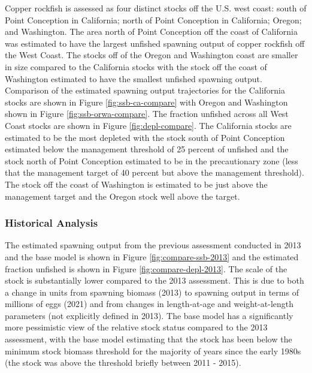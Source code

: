 \documentclass[11pt,
  english,
  a4paper,
]{article}
\begin{document}
\leavevmode\tagmcend\tagstructend


Copper rockfish is assessed as four distinct stocks off the U.S. west coast: south of Point Conception in California; north of Point Conception in California; Oregon; and Washington. The area north of Point Conception off the coast of California was estimated to have the largest unfished spawning output of copper rockfish off the West Coast. The stocks off of the Oregon and Washington coast are smaller in size compared to the California stocks with the stock off the coast of Washington estimated to have the smallest unfished spawning output. Comparison of the estimated spawning output trajectories for the California stocks are shown in Figure \ref{fig:ssb-ca-compare} with Oregon and Washington shown in Figure \ref{fig:ssb-orwa-compare}. The fraction unfished across all West Coast stocks are shown in Figure \ref{fig:depl-compare}. The California stocks are estimated to be the most depleted with the stock south of Point Conception estimated below the management threshold of 25 percent of unfished and the stock north of Point Conception estimated to be in the precautionary zone (less that the management target of 40 percent but above the management threshold). The stock off the coast of Washington is estimated to be just above the management target and the Oregon stock well above the target.

\leavevmode\tagmcend\tagstructend\par


\hypertarget{historical-analysis}{%
\subsubsection{Historical Analysis}\label{historical-analysis}}

\leavevmode\tagmcend\tagstructend


The estimated spawning output from the previous assessment conducted in 2013 and the base model is shown in Figure \ref{fig:compare-ssb-2013} and the estimated fraction unfished is shown in Figure \ref{fig:compare-depl-2013}. The scale of the stock is substantially lower compared to the 2013 assessment. This is due to both a change in units from spawning biomass (2013) to spawning output in terms of millions of eggs (2021) and from changes in length-at-age and weight-at-length parameters (not explicitly defined in 2013). The base model has a significantly more pessimistic view of the relative stock status compared to the 2013 assessment, with the base model estimating that the stock has been below the minimum stock biomass threshold for the majority of years since the early 1980s (the stock was above the threshold briefly between 2011 - 2015).
\end{document}
